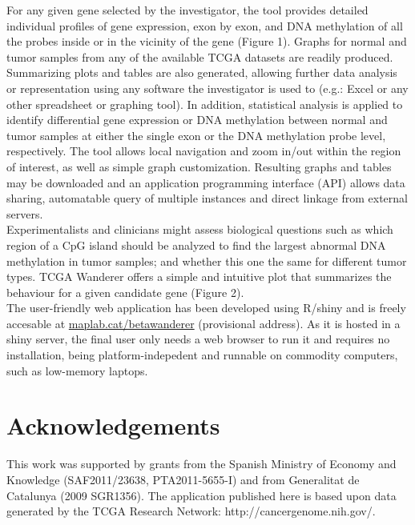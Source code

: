 \documentclass{article}
\begin{document}

For any given gene selected by the investigator, the tool provides detailed individual profiles of gene expression, exon by exon, and DNA methylation of all the probes inside or in the vicinity of the gene (Figure 1). Graphs for normal and tumor samples from any of the available TCGA datasets are readily produced. Summarizing plots and tables are also generated, allowing further data analysis or representation using any software the investigator is used to (e.g.: Excel or any other spreadsheet or graphing tool). In addition, statistical analysis is applied to identify differential gene expression or DNA methylation between normal and tumor samples at either the single exon or the DNA methylation probe level, respectively. The tool allows local navigation and zoom in/out within the region of interest, as well as simple graph customization. Resulting graphs and tables may be downloaded and an application programming interface (API) allows data sharing, automatable query of multiple instances and direct linkage from external servers.\\
 
Experimentalists and clinicians might assess biological questions such as which region of a CpG island should be analyzed to find the largest abnormal DNA methylation in tumor samples; and whether this one the same for different tumor types. TCGA Wanderer offers a simple and intuitive plot that summarizes the behaviour for a given candidate gene (Figure 2).\\

The user-friendly web application has been developed using R/shiny and is freely accesable at \url{maplab.cat/betawanderer} (provisional address). As it is hosted in a shiny server, the final user only needs a web browser to run it and requires no installation, being platform-indepedent and runnable on commodity computers, such as low-memory laptops.\\



\section{Acknowledgements}
This work was supported by grants from the Spanish Ministry of Economy and Knowledge (SAF2011/23638, PTA2011-5655-I) and from Generalitat de Catalunya (2009 SGR1356). The application published here is based upon data generated by the TCGA Research Network: http://cancergenome.nih.gov/. 
\end{document}
